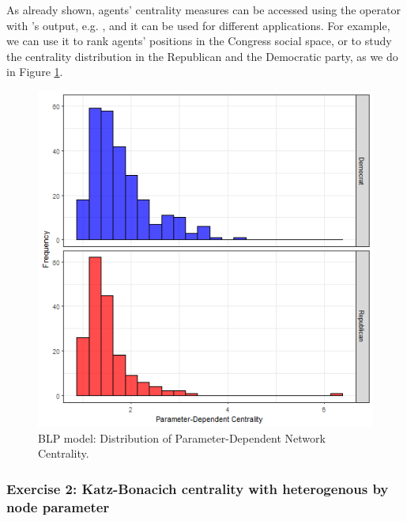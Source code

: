 \documentclass[nojss]{jss}
\begin{document}
As already shown, agents' centrality measures can be accessed using the operator \code{\$} with 's output, e.g. , and it can be used for different applications. For example, we can use it to rank agents' positions in the Congress social space, or to study the centrality distribution in the Republican and the Democratic party, as we do in Figure \ref{fig:figure1}. 
\begin{figure}[t!]
\centering
\includegraphics{Figure1}
\caption{\label{fig:figure1} BLP model: Distribution of Parameter-Dependent Network Centrality.}
\end{figure}

\subsubsection{Exercise 2: Katz-Bonacich centrality with heterogenous by node parameter}
\end{document}
